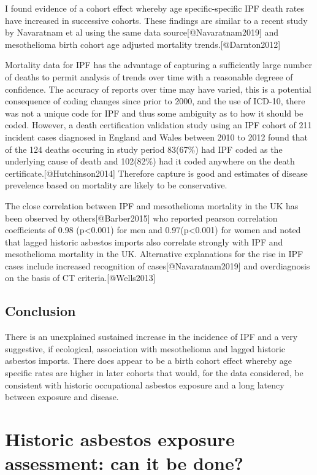 \documentclass[
]{article}
\begin{document}
I found evidence of a cohort effect whereby age specific-specific IPF
death rates have increased in successive cohorts. These findings are
similar to a recent study by Navaratnam et al using the same data
source{[}@Navaratnam2019{]} and mesothelioma birth cohort age adjusted
mortality trends.{[}@Darnton2012{]}

Mortality data for IPF has the advantage of capturing a sufficiently
large number of deaths to permit analysis of trends over time with a
reasonable degreee of confidence. The accuracy of reports over time may
have varied, this is a potential consequence of coding changes since
prior to 2000, and the use of ICD-10, there was not a unique code for
IPF and thus some ambiguity as to how it should be coded. However, a
death certification validation study using an IPF cohort of 211 incident
cases diagnosed in England and Wales between 2010 to 2012 found that of
the 124 deaths occuring in study period 83(67\%) had IPF coded as the
underlying cause of death and 102(82\%) had it coded anywhere on the
death certificate.{[}@Hutchinson2014{]} Therefore capture is good and
estimates of disease prevelence based on mortality are likely to be
conservative.

The close correlation between IPF and mesothelioma mortality in the UK
has been observed by others{[}@Barber2015{]} who reported pearson
correlation coefficients of 0.98 (p\textless0.001) for men and
0.97(p\textless0.001) for women and noted that lagged historic asbestos
imports also correlate strongly with IPF and mesothelioma mortality in
the UK. Alternative explanations for the rise in IPF cases include
increased recognition of cases{[}@Navaratnam2019{]} and overdiagnosis on
the basis of CT criteria.{[}@Wells2013{]}

\hypertarget{conclusion-1}{%
\subsection{Conclusion}\label{conclusion-1}}

There is an unexplained sustained increase in the incidence of IPF and a
very suggestive, if ecological, association with mesothelioma and lagged
historic asbestos imports. There does appear to be a birth cohort effect
whereby age specific rates are higher in later cohorts that would, for
the data considered, be consistent with historic occupational asbestos
exposure and a long latency between exposure and disease.

\hypertarget{historic-asbestos-exposure-assessment-can-it-be-done}{%
\section{Historic asbestos exposure assessment: can it be
done?}\label{historic-asbestos-exposure-assessment-can-it-be-done}}
\end{document}
